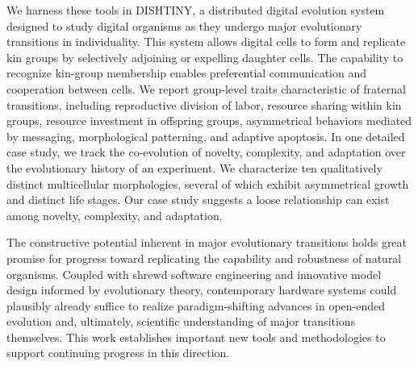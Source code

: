 We harness these tools in DISHTINY, a distributed digital evolution system designed to study digital organisms as they undergo major evolutionary transitions in individuality.
This system allows digital cells to form and replicate kin groups by selectively adjoining or expelling daughter cells.
The capability to recognize kin-group membership enables preferential communication and cooperation between cells.
We report group-level traits characteristic of fraternal transitions, including reproductive division of labor, resource sharing within kin groups, resource investment in offspring groups, asymmetrical behaviors mediated by messaging, morphological patterning, and adaptive apoptosis.
In one detailed case study, we track the co-evolution of novelty, complexity, and adaptation over the evolutionary history of an experiment.
We characterize ten qualitatively distinct multicellular morphologies, several of which exhibit asymmetrical growth and distinct life stages.
Our case study suggests a loose relationship can exist among novelty, complexity, and adaptation.

The constructive potential inherent in major evolutionary transitions holds great promise for progress toward replicating the capability and robustness of natural organisms.
Coupled with shrewd software engineering and innovative model design informed by evolutionary theory, contemporary hardware systems could plausibly already suffice to realize paradigm-shifting advances in open-ended evolution and, ultimately, scientific understanding of major transitions themselves.
This work establishes important new tools and methodologies to support continuing progress in this direction.
